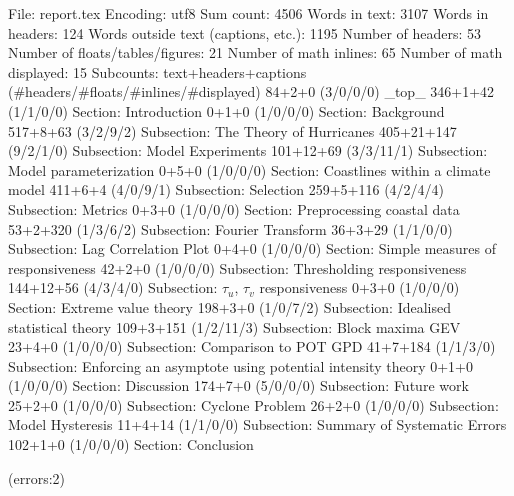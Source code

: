 
File: report.tex
Encoding: utf8
Sum count: 4506
Words in text: 3107
Words in headers: 124
Words outside text (captions, etc.): 1195
Number of headers: 53
Number of floats/tables/figures: 21
Number of math inlines: 65
Number of math displayed: 15
Subcounts:
  text+headers+captions (#headers/#floats/#inlines/#displayed)
  84+2+0 (3/0/0/0) _top_
  346+1+42 (1/1/0/0) Section: Introduction
  0+1+0 (1/0/0/0) Section: Background
  517+8+63 (3/2/9/2) Subsection: The Theory of Hurricanes
  405+21+147 (9/2/1/0) Subsection: Model Experiments
  101+12+69 (3/3/11/1) Subsection: Model parameterization
  0+5+0 (1/0/0/0) Section: Coastlines within a climate model
  411+6+4 (4/0/9/1) Subsection: Selection
  259+5+116 (4/2/4/4) Subsection: Metrics
  0+3+0 (1/0/0/0) Section: Preprocessing coastal data
  53+2+320 (1/3/6/2) Subsection: Fourier Transform
  36+3+29 (1/1/0/0) Subsection: Lag Correlation Plot
  0+4+0 (1/0/0/0) Section: Simple measures of responsiveness
  42+2+0 (1/0/0/0) Subsection: Thresholding responsiveness
  144+12+56 (4/3/4/0) Subsection: $\tau_u$, $\tau_v$ responsiveness
  0+3+0 (1/0/0/0) Section: Extreme value theory
  198+3+0 (1/0/7/2) Subsection: Idealised statistical theory
  109+3+151 (1/2/11/3) Subsection: Block maxima GEV
  23+4+0 (1/0/0/0) Subsection: Comparison to POT GPD
  41+7+184 (1/1/3/0) Subsection: Enforcing an asymptote using potential intensity theory 
  0+1+0 (1/0/0/0) Section: Discussion
  174+7+0 (5/0/0/0) Subsection: Future work
  25+2+0 (1/0/0/0) Subsection: Cyclone Problem
  26+2+0 (1/0/0/0) Subsection: Model Hysteresis
  11+4+14 (1/1/0/0) Subsection: Summary of Systematic Errors
  102+1+0 (1/0/0/0) Section: Conclusion

(errors:2)
